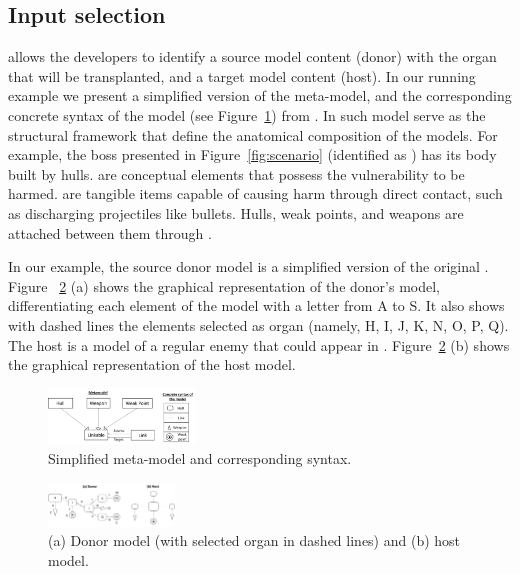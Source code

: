 \subsection{Input selection}

\ApproachName{} allows the developers to identify a source model content (donor) with the organ that will be transplanted, and a target model content (host). 
In our running example we present a simplified version of the meta-model, and the corresponding concrete syntax of the model (see Figure~\ref{fig:metamodel+syntax}) from  \CaseStudy{}.  In such model  serve as the structural framework that define the anatomical composition of the models. For example, the boss presented in Figure~\ref{fig:scenario} (identified as ) has its body built by hulls.  are conceptual elements that possess the vulnerability to be harmed.
 are tangible items capable of causing harm through direct contact, such as discharging projectiles like bullets. Hulls, weak points, and weapons are attached between them through .

In our example, the source donor model is a simplified version of the original \CaseStudy{}  . Figure ~\ref{fig:donor_host} (a) shows the graphical representation of the donor's model, differentiating each element of the model with a letter from A to S. It also shows with dashed lines the elements selected as organ (namely, H, I, J, K, N, O, P, Q). The host is a model of a regular enemy that could appear in \CaseStudy{}. Figure~\ref{fig:donor_host} (b) shows the graphical representation of the host model.

\begin{figure}[tb]
	\centering
	\includegraphics[width=0.35\textwidth]{Figures/metamodel+syntax.png}
	\caption{Simplified meta-model and corresponding syntax.}
	\label{fig:metamodel+syntax}
\end{figure}

\begin{figure}[tb]
    \centering
    \includegraphics[width=0.30\textwidth]{Figures/donor+host.png}
    \caption{(a) Donor model (with selected organ in dashed lines) and (b) host model.}
    \label{fig:donor_host}
\end{figure}

